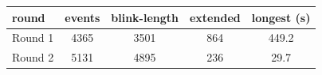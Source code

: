 \begin{tabular}{lcccc}
\hline
round & events & blink-length & extended & longest (s) \\
\hline
Round 1 & 4365 & 3501 & 864 & 449.2 \\
Round 2 & 5131 & 4895 & 236 & 29.7 \\
\hline
\end{tabular}
